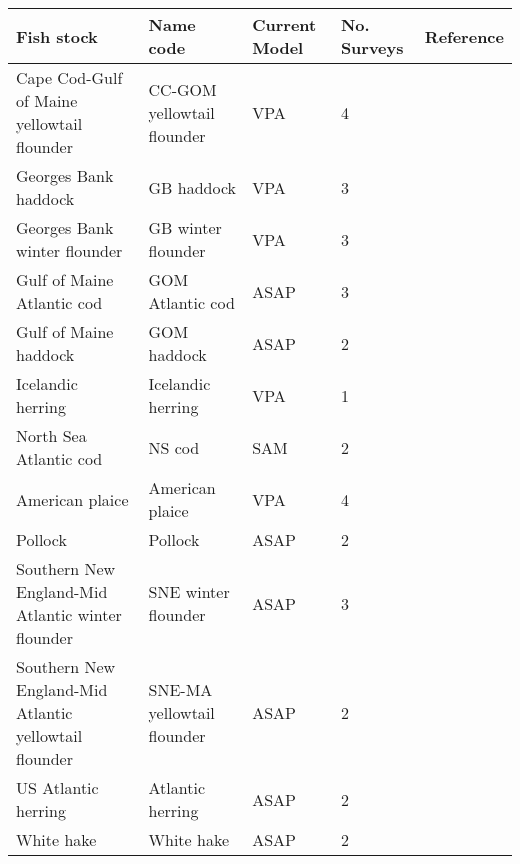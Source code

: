 \begin{tabular}{lllll}
\toprule
Fish stock & Name code & Current Model & No. Surveys & Reference\\
\midrule
Cape Cod-Gulf of Maine yellowtail flounder & CC-GOM yellowtail flounder & VPA & 4 & \citet{nefsc17} \\
Georges Bank haddock & GB haddock & VPA & 3 & \citet{nefsc17} \\
Georges Bank winter flounder & GB winter flounder & VPA & 3 & \citet{nefsc17} \\
Gulf of Maine Atlantic cod & GOM Atlantic cod & ASAP & 3 & \citet{nefsc17} \\
Gulf of Maine haddock & GOM haddock & ASAP & 2 & \citet{nefsc17} \\
Icelandic herring & Icelandic herring & VPA & 1 & \\
North Sea Atlantic cod & NS cod & SAM & 2 & \citet{ices18}\\
American plaice & American plaice & VPA & 4 & \citet{nefsc17} \\
Pollock & Pollock & ASAP & 2 & \citet{nefsc17} \\
Southern New England-Mid Atlantic winter flounder & SNE winter flounder & ASAP & 3 & \citet{nefsc17} \\
Southern New England-Mid Atlantic yellowtail flounder & SNE-MA yellowtail flounder & ASAP & 2 & \citet{nefsc17} \\
US Atlantic herring & Atlantic herring & ASAP & 2 & \citet{deroba15} \\
White hake & White hake & ASAP & 2 & \citet{nefsc17} \\
\bottomrule
\end{tabular}
